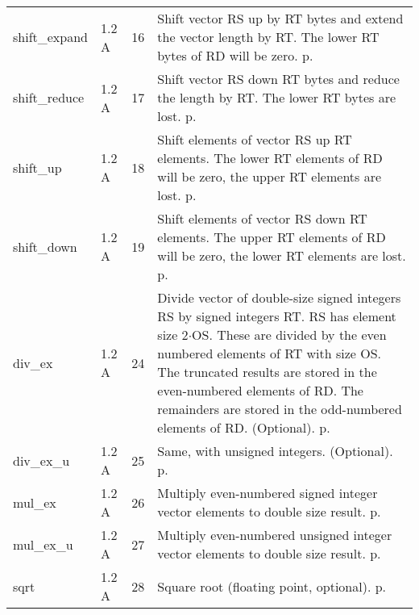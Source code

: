 \documentclass[forwardcom.tex]{subfiles}
\begin{document}
\begin{longtable} {|p{25mm}|p{14mm}|p{10mm}|p{95mm}|}
shift\_expand & 1.2 A & 16 & Shift vector RS up by RT bytes and extend the vector length by RT. The lower RT bytes of RD will be zero. p. \pageref{table:shiftExpandInstruction} \\
shift\_reduce & 1.2 A & 17 & Shift vector RS down RT bytes and reduce the length by RT. The lower RT bytes are lost. p. \pageref{table:shiftReduceInstruction} \\
shift\_up     & 1.2 A & 18 & Shift elements of vector RS up RT elements. The lower RT elements of RD will be zero, the upper RT elements are lost. p. \pageref{table:shiftUpInstruction} \\
shift\_down   & 1.2 A & 19 & Shift elements of vector RS down RT elements. The upper RT elements of RD will be zero, the lower RT elements are lost. p. \pageref{table:shiftDownInstruction} \\

div\_ex    & 1.2 A & 24 & Divide vector of double-size signed integers RS by signed integers RT. RS has element size 2$\cdot$OS. These are divided by the even numbered
elements of RT with size OS. The truncated results are stored in
the even-numbered elements of RD. The remainders are stored in
the odd-numbered elements of RD. (Optional). p. \pageref{table:divExInstruction} \\
div\_ex\_u    & 1.2 A & 25 & Same, with unsigned integers. (Optional). p. \pageref{table:divExUInstruction} \\
mul\_ex       & 1.2 A & 26 & Multiply even-numbered signed integer vector elements to double size result. p. \pageref{table:mulExInstruction} \\
mul\_ex\_u    & 1.2 A & 27 & Multiply even-numbered unsigned integer vector elements to double size result. p. \pageref{table:mulExUInstruction} \\
sqrt          & 1.2 A & 28 & Square root (floating point, optional). p. \pageref{table:sqrtInstruction} \\


\end{longtable}
\end{document}
